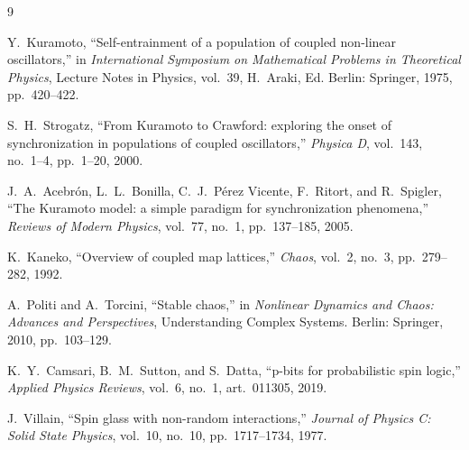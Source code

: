 \documentclass[11pt]{article}
\begin{document}
\begin{thebibliography}{9}

Y.~Kuramoto,
``Self-entrainment of a population of coupled non-linear oscillators,''
in \emph{International Symposium on Mathematical Problems in Theoretical Physics},
Lecture Notes in Physics, vol.~39, H.~Araki, Ed.
Berlin: Springer, 1975, pp.~420--422.

S.~H.~Strogatz,
``From Kuramoto to Crawford: exploring the onset of synchronization in populations of coupled oscillators,''
\emph{Physica D}, vol.~143, no.~1--4, pp.~1--20, 2000.

J.~A.~Acebr\'on, L.~L.~Bonilla, C.~J.~P\'erez Vicente, F.~Ritort, and R.~Spigler,
``The Kuramoto model: a simple paradigm for synchronization phenomena,''
\emph{Reviews of Modern Physics}, vol.~77, no.~1, pp.~137--185, 2005.

K.~Kaneko,
``Overview of coupled map lattices,''
\emph{Chaos}, vol.~2, no.~3, pp.~279--282, 1992.

A.~Politi and A.~Torcini,
``Stable chaos,''
in \emph{Nonlinear Dynamics and Chaos: Advances and Perspectives}, Understanding Complex Systems.
Berlin: Springer, 2010, pp.~103--129.

K.~Y.~Camsari, B.~M.~Sutton, and S.~Datta,
``p-bits for probabilistic spin logic,''
\emph{Applied Physics Reviews}, vol.~6, no.~1, art.~011305, 2019.

J.~Villain,
``Spin glass with non-random interactions,''
\emph{Journal of Physics C: Solid State Physics}, vol.~10, no.~10, pp.~1717--1734, 1977.

\end{thebibliography}
\end{document}
